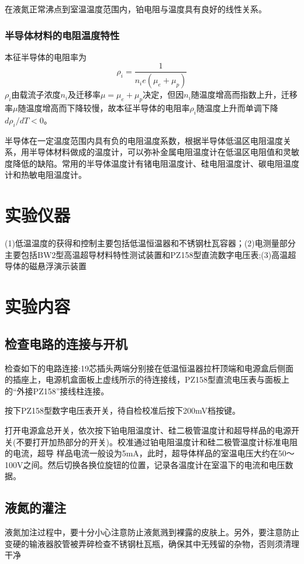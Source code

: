 \documentclass[UTF8]{ctexart}
\begin{document}
\begin{multicols}{2}
在液氮正常沸点到室温温度范围内，铂电阻与温度具有良好的线性关系。

\subsubsection{半导体材料的电阻温度特性}
本征半导体的电阻率为
\begin{equation}
\rho_{i}=\frac{1}{n_{i} e\left(\mu_{e}+\mu_{p}\right)}
\end{equation}
$\rho_{i}$由载流子浓度$n_{i}$及迁移率$\mu = \mu_{e}+\mu_{p}$决定，但因$n_{i}$随温度增高而指数上升，迁移率$\mu$随温度增高而下降较慢，故本征半导体的电阻率$\rho_{i}$随温度上升而单调下降$d \rho_{i} / d T<0$。

半导体在一定温度范围内具有负的电阻温度系数，根据半导体低温区电阻温度关系，用半导体材料做成的温度计，可以弥补金属电阻温度计在低温区电阻值和灵敏度降低的缺陷。常用的半导体温度计有锗电阻温度计、硅电阻温度计、碳电阻温度计和热敏电阻温度计。

\section{实验仪器}
(1)低温温度的获得和控制主要包括低温恒温器和不锈钢杜瓦容器；(2)电测量部分主要包括BW2型高温超导材料特性测试装置和PZ158型直流数字电压表;(3)高温超导体的磁悬浮演示装置

\section{实验内容}
\subsection{检查电路的连接与开机}
检查如下的电路连接:19芯插头两端分别接在低温恒温器拉杆顶端和电源盒后侧面的插座上，电源机盒面板上虚线所示的待连接线，PZ158型直流电压表与面板上的“外接PZ158”接线柱连接。

按下PZ158型数字电压表开关，待自检校准后按下200mV档按键。

打开电源盒总开关，依次按下铂电阻温度计、硅二极管温度计和超导样品的电源开关(不要打开加热部分的开关)。校准通过铂电阻温度计和硅二极管温度计标准电阻的电流，超导
样品电流一般设为5mA，此时，超导体样品的室温电压大约在50～100V之间。然后切换各换位旋钮的位置，记录各温度计在室温下的电流和电压数据。
\subsection{液氮的灌注}
液氮加注过程中，要十分小心注意防止液氮溅到裸露的皮肤上。另外，要注意防止变硬的输液器胶管被弄碎检查不锈钢杜瓦瓶，确保其中无残留的杂物，否则须清理干净


\end{multicols}
\end{document}
